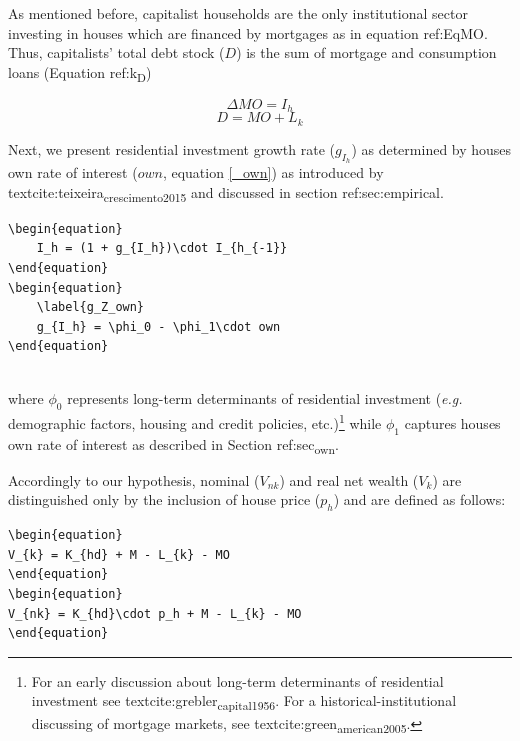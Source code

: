 \documentclass[12pt]{article}
\begin{document}
\begin{enumerate}
As mentioned before, capitalist households are the only institutional sector investing in houses which are financed by mortgages as in equation ref:EqMO.
Thus, capitalists' total debt stock (\(D\)) is the sum of mortgage and consumption loans (Equation ref:k\textsubscript{D})

\begin{equation}
  \label{EqMO}
  \Delta MO = I_h
\end{equation}
\begin{equation}
  \label{k_D}
  D =  MO + L_k
\end{equation}



Next, we present residential investment growth rate (\(g_{I_h}\)) as determined by houses own rate of interest (\(own\), equation \ref{_own}) as introduced by textcite:teixeira\textsubscript{crescimento}\textsubscript{2015} and discussed in section ref:sec:empirical.


\begin{verbatim}
\begin{equation}
	I_h = (1 + g_{I_h})\cdot I_{h_{-1}}
\end{equation}
\begin{equation}
	\label{g_Z_own}
	g_{I_h} = \phi_0 - \phi_1\cdot own
\end{equation}


\end{verbatim}
where  \(\phi_0\) represents long-term determinants of residential investment (\emph{e.g.} demographic factors, housing and credit policies, etc.)\footnote{For an early discussion about long-term determinants of residential investment see textcite:grebler\textsubscript{capital}\textsubscript{1956}. For a historical-institutional discussing of mortgage markets, see textcite:green\textsubscript{american}\textsubscript{2005}.} while \(\phi_1\) captures houses own rate of interest as described in Section ref:sec\textsubscript{own}.

Accordingly to our hypothesis, nominal (\(V_{nk}\)) and real net wealth (\(V_{k}\)) are distinguished only by the inclusion of house price (\(p_h\)) and are defined as follows:
\begin{verbatim}
\begin{equation}
V_{k} = K_{hd} + M - L_{k} - MO
\end{equation}
\begin{equation}
V_{nk} = K_{hd}\cdot p_h + M - L_{k} - MO
\end{equation}
\end{verbatim}



\end{enumerate}
\end{document}
